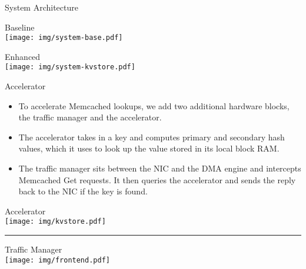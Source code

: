\begin{block}{System Architecture}
\begin{multicols}{2}
\centering
\alert{Baseline} \\[0.5\baselineskip]
\texttt{[image: img/system-base.pdf]}

\columnbreak

\centering
\alert{Enhanced} \\[0.5\baselineskip]
\texttt{[image: img/system-kvstore.pdf]}
\end{multicols}
\end{block}

\vspace{1ex}

\begin{block}{Accelerator}

\begin{multicols}{2}
\begin{itemize}
\footnotesize
    \item To accelerate Memcached lookups, we add two additional hardware
        blocks, the traffic manager and the accelerator.
    \item The accelerator takes in a key and computes primary and secondary
        hash values, which it uses to look up the value stored in its local
        block RAM.

    \item The traffic manager sits between the NIC and the DMA engine and
        intercepts Memcached Get requests. It then queries the accelerator
        and sends the reply back to the NIC if the key is found.
\end{itemize}

\columnbreak
\begin{center}
    \footnotesize Accelerator \\[0.5\baselineskip]
    \texttt{[image: img/kvstore.pdf]}
\end{center}
\hrule
\begin{center}
    \footnotesize Traffic Manager \\[0.5\baselineskip]
    \texttt{[image: img/frontend.pdf]}
\end{center}

\end{multicols}

\end{block}
